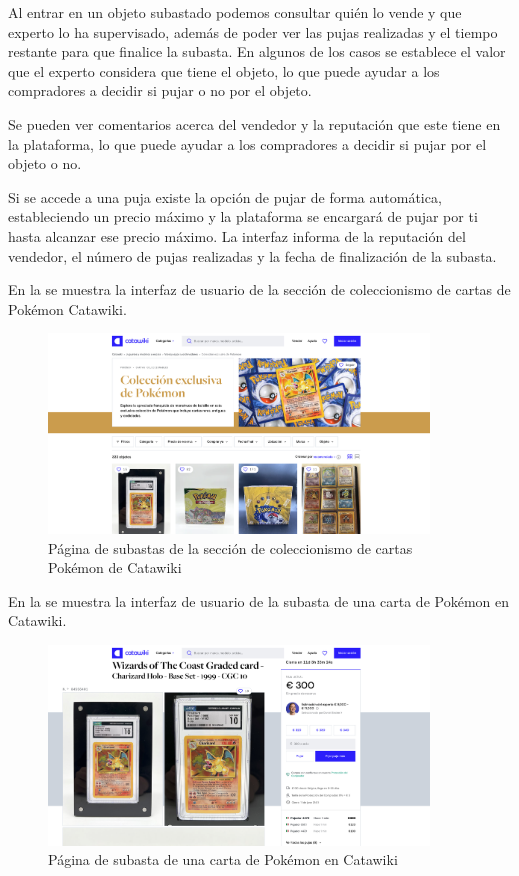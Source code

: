 Al entrar en un objeto subastado podemos consultar quién lo vende y que experto lo ha supervisado, además de poder ver las pujas realizadas y el tiempo restante para que finalice la subasta.
En algunos de los casos se establece el valor que el experto considera que tiene el objeto, lo que puede ayudar a los compradores a decidir si pujar o no por el objeto.

Se pueden ver comentarios acerca del vendedor y la reputación que este tiene en la plataforma, lo que puede ayudar a los compradores a decidir si pujar por el objeto o no.

Si se accede a una puja existe la opción de pujar de forma automática, estableciendo un precio máximo y la plataforma se encargará de pujar por ti hasta alcanzar ese precio máximo.
La interfaz informa de la reputación del vendedor, el número de pujas realizadas y la fecha de finalización de la subasta.

En la  se muestra la interfaz de usuario de la sección de coleccionismo de cartas de Pokémon Catawiki.

\begin{figure}[H]
    \centering
    \includegraphics[width=0.9\textwidth]{figures/4-Estudio-viabilidad/4_Catawiki.png}
    \caption{Página de subastas de la sección de coleccionismo de cartas Pokémon de Catawiki}
    \label{fig:catawiki}
    \hypertarget{fig:catawiki}{}
\end{figure}

En la  se muestra la interfaz de usuario de la subasta de una carta de Pokémon en Catawiki.
\begin{figure}[H]
    \centering
    \includegraphics[width=0.9\textwidth]{figures/4-Estudio-viabilidad/4_Catawiki-puja.png}
    \caption{Página de subasta de una carta de Pokémon en Catawiki}
    \label{fig:catawiki2}
    \hypertarget{fig:catawiki2}{}
\end{figure}